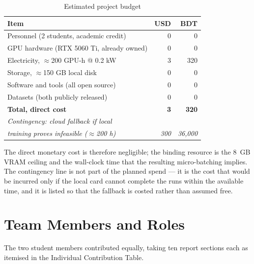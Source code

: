 \documentclass[conference]{IEEEtran}
\begin{document}
\begin{table}[!t]
\caption{Estimated project budget}
\label{tab:budget}
\centering
\renewcommand{\arraystretch}{1.2}
\begin{tabularx}{\columnwidth}{@{}>{\raggedright\arraybackslash}X r r@{}}
\toprule
\textbf{Item} & \textbf{USD} & \textbf{BDT} \\
\midrule
Personnel (2 students, academic credit)        & 0   & 0 \\
GPU hardware (RTX 5060 Ti, already owned)      & 0   & 0 \\
Electricity, $\approx$200 GPU-h @ 0.2 kW       & 3   & 320 \\
Storage, $\approx$150 GB local disk            & 0   & 0 \\
Software and tools (all open source)           & 0   & 0 \\
Datasets (both publicly released)              & 0   & 0 \\
\midrule
\textbf{Total, direct cost}                    & \textbf{3} & \textbf{320} \\
\midrule
\emph{Contingency: cloud fallback if local}    &     & \\
\emph{training proves infeasible ($\approx$200 h)} & \emph{300} & \emph{36,000} \\
\bottomrule
\end{tabularx}
\end{table}

The direct monetary cost is therefore negligible; the binding resource is the
8~GB VRAM ceiling and the wall-clock time that the resulting micro-batching
implies. The contingency line is not part of the planned spend --- it is the
cost that would be incurred only if the local card cannot complete the runs
within the available time, and it is listed so that the fallback is costed
rather than assumed free.

\section{Team Members and Roles}
The two student members contributed equally, taking ten report sections each
as itemised in the Individual Contribution Table.
\end{document}
